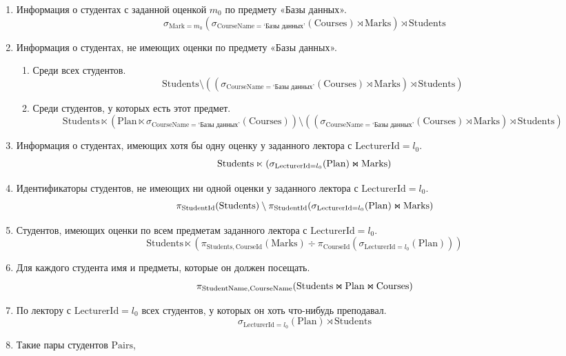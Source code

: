 \documentclass{article}
\newcommand{\Students}{\mathrm{Students}}
\newcommand{\StudentId}{\mathrm{StudentId}}
\newcommand{\StudentName}{\mathrm{StudentName}}
\newcommand{\Courses}{\mathrm{Courses}}
\newcommand{\CourseId}{\mathrm{CourseId}}
\newcommand{\CourseName}{\mathrm{CourseName}}
\newcommand{\Plan}{\mathrm{Plan}}
\newcommand{\LecturerId}{\mathrm{LecturerId}}
\newcommand{\Marks}{\mathrm{Marks}}
\newcommand{\Mark}{\mathrm{Mark}}
\newcommand{\join}{\mathbin{\mathrlap{\ltimes}{\rtimes}}}
\begin{document}
\begin{enumerate}
    \item Информация о студентах с заданной оценкой $m_0$ по предмету «Базы данных».
    \[
        \sigma_{\Mark = m_0}
        (\sigma_{\CourseName = \text{`Базы данных'}}(\Courses)
        \rtimes \Marks)
        \rtimes \Students
    \]
    \item Информация о студентах, не имеющих оценки по предмету «Базы данных».
    \begin{enumerate}
        \item Среди всех студентов.
        \[
            \Students \setminus (
            (\sigma_{\CourseName = \text{`Базы данных'}}(\Courses)
            \rtimes \Marks)
            \rtimes \Students)
        \]
        \item Среди студентов, у которых есть этот предмет.
        \[
            \Students \ltimes (
            \Plan \ltimes
            \sigma_{\CourseName = \text{`Базы данных'}}(\Courses))
            \setminus (
            (\sigma_{\CourseName = \text{`Базы данных'}}(\Courses)
            \rtimes \Marks)
            \rtimes \Students)
        \]
    \end{enumerate}
    \item Информация о студентах, имеющих хотя бы одну оценку у заданного
        лектора с $\LecturerId=l_0$.
    \[
        \Students \ltimes (\sigma_{\LecturerId = l_0}(\Plan) \join \Marks)
    \]
    \item Идентификаторы студентов, не имеющих ни одной оценки у заданного
        лектора с $\LecturerId=l_0$.
    \[
        \pi_{\StudentId}(\Students)\setminus
        \pi_{\StudentId}(\sigma_{\LecturerId = l_0}(\Plan) \join \Marks)
    \]
    \item Студентов, имеющих оценки по всем предметам заданного
        лектора с $\LecturerId=l_0$.
    \[
        \Students \ltimes (
        \pi_{\Students, \CourseId}(\Marks) \div
        \pi_{\CourseId}(\sigma_{\LecturerId=l_0}(\Plan)))
    \]
    \item Для каждого студента имя и предметы, которые он должен посещать.
    \[
        \pi_{\StudentName, \CourseName}(\Students \join \Plan \join \Courses)
    \]
    \item По лектору с $\LecturerId=l_0$ всех студентов,
        у которых он хоть что-нибудь преподавал.
    \[
        \sigma_{\LecturerId=l_0}(\Plan) \rtimes \Students
    \]
    \item Такие пары студентов $\mathrm{Pairs}$,

\end{enumerate}
\end{document}
